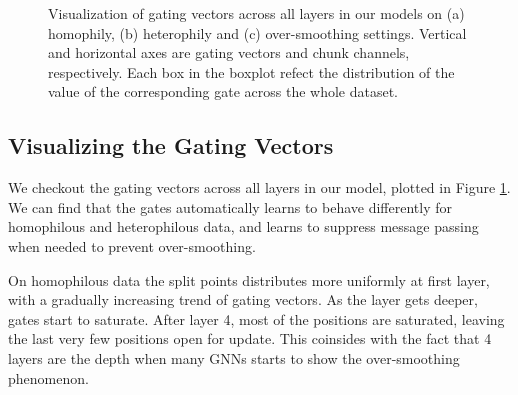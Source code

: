 \documentclass{article}
\begin{document}
\begin{figure}
\centering
{}
\caption{Visualization of gating vectors across all layers in our models on (a) homophily, (b) heterophily and (c) over-smoothing settings. Vertical and horizontal axes are gating vectors and chunk channels, respectively. Each box in the boxplot refect the distribution of the value of the corresponding gate across the whole dataset.}
\label{fig.gate_values}
\end{figure}

\subsection{Visualizing the Gating Vectors}
We checkout the gating vectors across all layers in our model, plotted in Figure \ref{fig.gate_values}. We can find that the gates automatically learns to behave differently for homophilous and heterophilous data, and learns to suppress message passing when needed to prevent over-smoothing. 

On homophilous data the split points distributes more uniformly at first layer, with a gradually increasing trend of gating vectors. As the layer gets deeper, gates start to saturate. After layer 4, most of the positions are saturated, leaving the last very few positions open for update. This coinsides with the fact that 4 layers are the depth when many GNNs starts to show the over-smoothing phenomenon.
\end{document}
